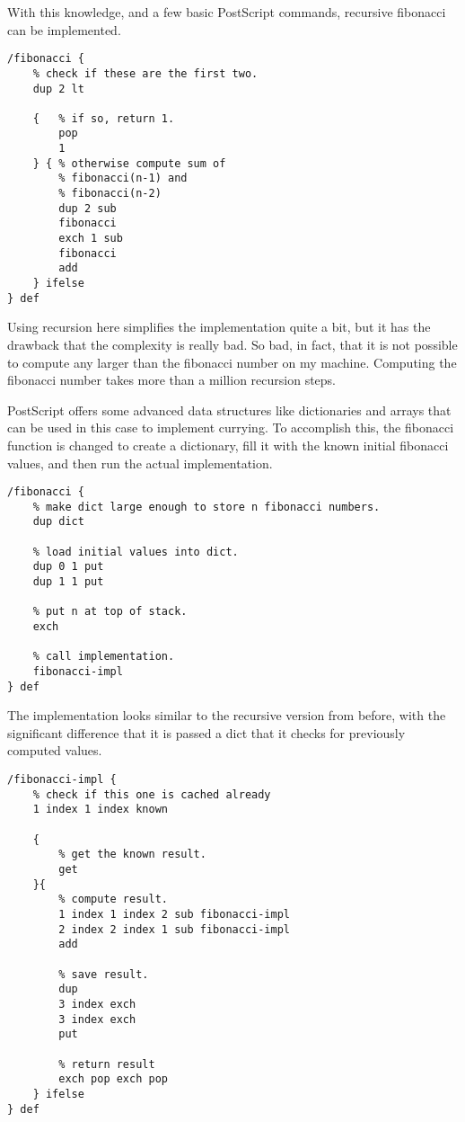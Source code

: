 \documentclass[a4paper,twocolumn]{article}
\begin{document}
With this knowledge, and a few basic PostScript commands, recursive fibonacci can be implemented.

\begin{verbatim}
/fibonacci {
    % check if these are the first two.
    dup 2 lt

    {   % if so, return 1.
        pop
        1
    } { % otherwise compute sum of
        % fibonacci(n-1) and 
        % fibonacci(n-2)
        dup 2 sub
        fibonacci
        exch 1 sub
        fibonacci
        add
    } ifelse
} def
\end{verbatim}

Using recursion here simplifies the implementation quite a bit, but it has the drawback that the complexity is really bad. So bad, in fact, that it is not possible to compute any larger than the  fibonacci number on my machine. Computing the  fibonacci number takes more than a million recursion steps.

PostScript offers some advanced data structures like dictionaries and arrays that can be used in this case to implement currying. To accomplish this, the fibonacci function is changed to create a dictionary, fill it with the known initial fibonacci values, and then run the actual implementation.

\begin{verbatim}
/fibonacci {
    % make dict large enough to store n fibonacci numbers.
    dup dict

    % load initial values into dict.
    dup 0 1 put
    dup 1 1 put

    % put n at top of stack.
    exch

    % call implementation.
    fibonacci-impl
} def
\end{verbatim}

The implementation looks similar to the recursive version from before, with the significant difference that it is passed a dict that it checks for previously computed values.

\begin{verbatim}
/fibonacci-impl {
    % check if this one is cached already
    1 index 1 index known

    {
        % get the known result.
        get
    }{
        % compute result.
        1 index 1 index 2 sub fibonacci-impl
        2 index 2 index 1 sub fibonacci-impl
        add

        % save result.
        dup
        3 index exch
        3 index exch
        put

        % return result
        exch pop exch pop
    } ifelse
} def  
\end{verbatim}
\end{document}
